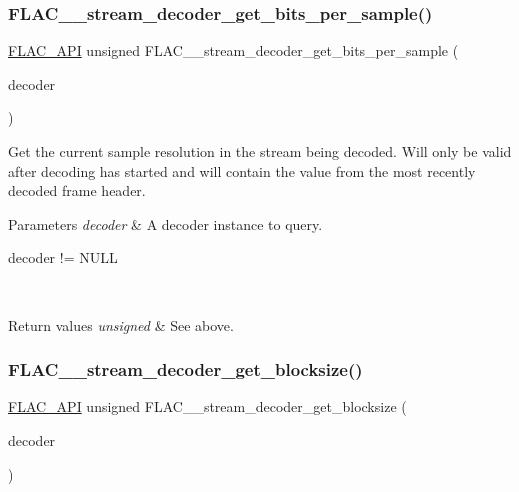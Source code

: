 \subsubsection{\texorpdfstring{F\+L\+A\+C\+\_\+\+\_\+stream\+\_\+decoder\+\_\+get\+\_\+bits\+\_\+per\+\_\+sample()}{FLAC\_\_stream\_decoder\_get\_bits\_per\_sample()}}
{\footnotesize\ttfamily \hyperlink{group__flac__export_ga56ca07df8a23310707732b1c0007d6f5}{F\+L\+A\+C\+\_\+\+A\+PI} unsigned F\+L\+A\+C\+\_\+\+\_\+stream\+\_\+decoder\+\_\+get\+\_\+bits\+\_\+per\+\_\+sample (\begin{DoxyParamCaption}\item[{\hyperlink{zconf_8h_a2c212835823e3c54a8ab6d95c652660e}{const} \hyperlink{struct_f_l_a_c_____stream_decoder}{F\+L\+A\+C\+\_\+\+\_\+\+Stream\+Decoder} $\ast$}]{decoder }\end{DoxyParamCaption})}

Get the current sample resolution in the stream being decoded. Will only be valid after decoding has started and will contain the value from the most recently decoded frame header.


\begin{DoxyParams}{Parameters}
{\em decoder} & A decoder instance to query.  
\begin{DoxyCode}
decoder != NULL 
\end{DoxyCode}
 \\
\hline
\end{DoxyParams}

\begin{DoxyRetVals}{Return values}
{\em unsigned} & See above. \\
\hline
\end{DoxyRetVals}
\mbox{\label{group__flac__stream__decoder_ga9cd4807f4c6ee90338d271048fb28223}} 
\subsubsection{\texorpdfstring{F\+L\+A\+C\+\_\+\+\_\+stream\+\_\+decoder\+\_\+get\+\_\+blocksize()}{FLAC\_\_stream\_decoder\_get\_blocksize()}}
{\footnotesize\ttfamily \hyperlink{group__flac__export_ga56ca07df8a23310707732b1c0007d6f5}{F\+L\+A\+C\+\_\+\+A\+PI} unsigned F\+L\+A\+C\+\_\+\+\_\+stream\+\_\+decoder\+\_\+get\+\_\+blocksize (\begin{DoxyParamCaption}\item[{\hyperlink{zconf_8h_a2c212835823e3c54a8ab6d95c652660e}{const} \hyperlink{struct_f_l_a_c_____stream_decoder}{F\+L\+A\+C\+\_\+\+\_\+\+Stream\+Decoder} $\ast$}]{decoder }\end{DoxyParamCaption})}

